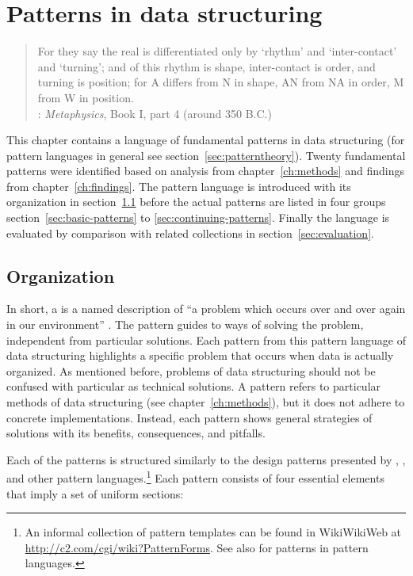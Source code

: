 \chapter{Patterns in data structuring}
\label{ch:patterns}

\begin{quotation}%
For they say the real is differentiated only by `rhythm' and `inter-contact'
and `turning'; and of this rhythm is shape, inter-contact is order, and
turning is position; for A differs from N in shape, AN from NA in order,
M from W in position.\\
\quotationsource {}: \textit{Metaphysics}, Book I, part 4
(around 350 B.C.)%
\end{quotation}

\noindent This chapter contains a language of fundamental patterns in data
structuring (for pattern languages in general see
section~\ref{sec:patterntheory}). Twenty fundamental patterns were identified
based on analysis from chapter~\ref{ch:methods} and findings from
chapter~\ref{ch:findings}. The pattern language is introduced with its
organization in section~\ref{sec:organization} before the actual patterns are
listed in four groups section~\ref{sec:basic-patterns} to
\ref{sec:continuing-patterns}.  Finally the language is evaluated by
comparison with related collections in section~\ref{sec:evaluation}.

\section{Organization}
\label{sec:organization}

In short, a  is a named description of ``a problem which occurs
over and over again in our environment'' \cite{Alexander1977}.  The pattern
guides to ways of solving the problem, independent from particular solutions.
Each pattern from this pattern language of data structuring highlights a
specific problem that occurs when data is actually organized. As mentioned
before, problems of data structuring should not be confused with particular
 as technical solutions. A pattern refers
to particular methods of data structuring (see chapter~\ref{ch:methods}), but
it does not adhere to concrete implementations. Instead, each pattern shows
general strategies of solutions with its benefits, consequences, and pitfalls.

Each of the patterns is structured similarly to the design patterns presented by
\textcite{Gamma1994}, \textcite{Cunnigham1995}, and other pattern
languages.\footnote{An informal collection of pattern templates can be found in
WikiWikiWeb at \url{http://c2.com/cgi/wiki?PatternForms}. See also
\textcite{Meszaros1997} for patterns in pattern languages.} Each pattern
consists of four essential elements that imply a set of uniform sections:

